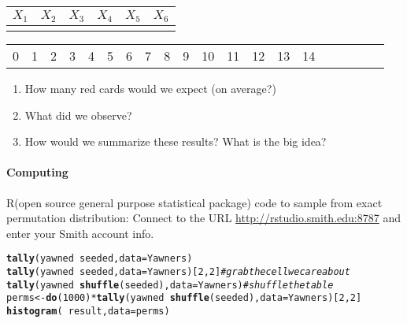 \documentclass[10pt]{article}\usepackage[]{graphicx}\usepackage[]{color}
\makeatletter
\newcommand{\hlnum}[1]{\textcolor[rgb]{0.686,0.059,0.569}{#1}}%
\newcommand{\hlcom}[1]{\textcolor[rgb]{0.678,0.584,0.686}{\textit{#1}}}%
\newcommand{\hlopt}[1]{\textcolor[rgb]{0,0,0}{#1}}%
\newcommand{\hlstd}[1]{\textcolor[rgb]{0.345,0.345,0.345}{#1}}%
\newcommand{\hlkwb}[1]{\textcolor[rgb]{0.69,0.353,0.396}{#1}}%
\newcommand{\hlkwc}[1]{\textcolor[rgb]{0.333,0.667,0.333}{#1}}%
\newcommand{\hlkwd}[1]{\textcolor[rgb]{0.737,0.353,0.396}{\textbf{#1}}}%
\newenvironment{kframe}{%
 \def\at@end@of@kframe{}%
 \ifinner\ifhmode%
  \def\at@end@of@kframe{\end{minipage}}%
  \begin{minipage}{\columnwidth}%
 \fi\fi%
 \def\FrameCommand##1{\hskip\@totalleftmargin \hskip-\fboxsep
 \colorbox{shadecolor}{##1}\hskip-\fboxsep
     \hskip-\linewidth \hskip-\@totalleftmargin \hskip\columnwidth}%
 \MakeFramed {\advance\hsize-\width
   \@totalleftmargin\z@ \linewidth\hsize
   \@setminipage}}%
 {\par\unskip\endMakeFramed%
 \at@end@of@kframe}
\newenvironment{knitrout}{}{} %
\newcommand{\ans}{\vspace{0.25in}}
\newcommand{\R}{{\sf R}\xspace}
\makeatother
\begin{document}
\begin{center}
\begin{tabular}{|c|c|c|c|c|c|}
  \hline
  $X_1$ & $X_2$ & $X_3$ & $X_4$ & $X_5$ & $X_6$ \\
  \hline
  \hspace{0.75in} & \hspace{0.75in} & \hspace{0.75in} & \hspace{0.75in} & \hspace{0.75in} & \hspace{0.75in} \\[5ex]
  \hline
\end{tabular}
\end{center}

\vspace{2.5in}

\begin{center}
\begin{tabular}{|c|c|c|c|c|c|c|c|c|c|c|c|c|c|c|c|c|c|c|c|}
  \hline
  0 & 1 & 2 & 3 & 4 & 5 & 6 & 7 & 8 & 9 & 10 & 11 & 12 & 13 & 14 \\
\end{tabular}
\end{center}
% 
\begin{enumerate}
  \itemsep1cm
  \item How many red cards would we expect (on average?)
  \item What did we observe?
  \item How would we summarize these results?   What is the big idea?
  \ans
\end{enumerate}

\paragraph{Computing}
\R (open source general purpose statistical package) code to sample from exact permutation distribution:
Connect to the URL \url{http://rstudio.smith.edu:8787} and enter your Smith account info.


\begin{knitrout}
\color{fgcolor}\begin{kframe}
\begin{alltt}
\hlkwd{tally}\hlstd{(yawned} \hlopt{~} \hlstd{seeded,} \hlkwc{data} \hlstd{= Yawners)}
\hlkwd{tally}\hlstd{(yawned} \hlopt{~} \hlstd{seeded,} \hlkwc{data} \hlstd{= Yawners)[}\hlnum{2}\hlstd{,}\hlnum{2}\hlstd{]}    \hlcom{# grab the cell we care about}
\hlkwd{tally}\hlstd{(yawned} \hlopt{~} \hlkwd{shuffle}\hlstd{(seeded),} \hlkwc{data} \hlstd{= Yawners)}  \hlcom{# shuffle the table}
\hlstd{perms} \hlkwb{<-} \hlkwd{do}\hlstd{(}\hlnum{1000}\hlstd{)} \hlopt{*} \hlkwd{tally}\hlstd{(yawned} \hlopt{~} \hlkwd{shuffle}\hlstd{(seeded),} \hlkwc{data} \hlstd{= Yawners)[}\hlnum{2}\hlstd{,}\hlnum{2}\hlstd{]}
\hlkwd{histogram}\hlstd{(}\hlopt{~}\hlstd{result,} \hlkwc{data} \hlstd{= perms)}
\end{alltt}
\end{kframe}
\end{knitrout}
\end{document}
